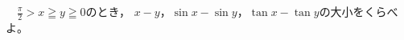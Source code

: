 \begin{problem}
　$\displaystyle\frac{\pi}{2}>x \geqq y \geqq 0$のとき，
$x-y$，$\sin x-\sin y$，$\tan x-\tan y$の大小をくらべよ。
\end{problem}
